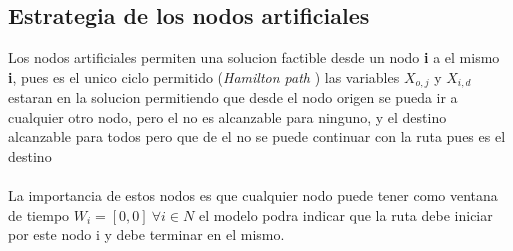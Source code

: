 \documentclass[journal, a4paper]{IEEEtran}
\begin{document}
\subsection{Estrategia de los nodos artificiales}
Los nodos artificiales permiten una solucion factible desde un nodo \textbf{i} a el mismo \textbf{i},
pues es el unico ciclo permitido (\textit{Hamilton path} \cite{hamdef}) las variables \(X_{o,j}\) y \(X_{i,d}\) estaran en 
la solucion permitiendo que desde el nodo origen se pueda ir a cualquier otro nodo, pero el no es alcanzable para 
ninguno, y el destino alcanzable para todos pero que de el no se puede continuar con la ruta pues es el destino\\
\\
La importancia de estos nodos es que cualquier nodo puede tener como ventana de tiempo 
\( W_{i}= [0,0] \> \forall i \in N\) el
modelo podra indicar que la ruta debe iniciar por este nodo i y debe terminar en el mismo.\\
\end{document}
